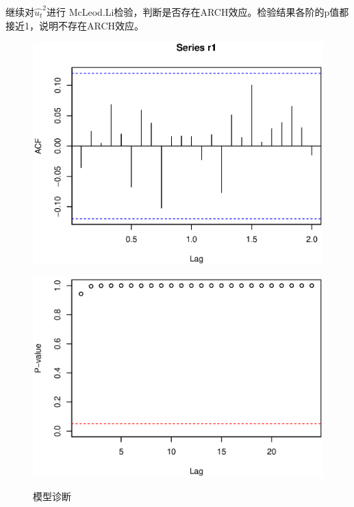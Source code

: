 \documentclass[10pt]{article}
\begin{document}
继续对$\hat{u_t}^2$进行 McLeod.Li检验，判断是否存在ARCH效应。检验结果各阶的p值都接近1，说明不存在ARCH效应。

\begin{figure}
\caption{模型诊断}
\begin{multicols}{2}
    \begin{minipage}[h]{0.5\textwidth} 
        \centering   
        \includegraphics[width=1\textwidth]{pic/acfr1.eps}   
           \label{fig:acfr1}   
    \end{minipage}
    \begin{minipage}[h]{0.5\textwidth}   
        \centering   
        \includegraphics[width=1\textwidth]{pic/mc_gr_ast.eps} 
        \label{fig:mcgrast}   
    \end{minipage}
\end{multicols}
\end{figure}
\end{document}

